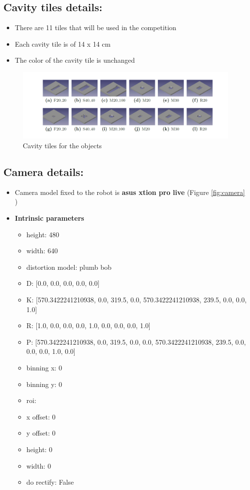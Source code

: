 \documentclass{article}
\begin{document}
\subsection{Cavity tiles details:}
\begin{itemize}
\item There are 11 tiles that will be used in the competition
\item Each cavity tile is of 14 x 14 cm 
\item The color of the cavity tile is unchanged 
\end{itemize}
\begin{figure}[h!]
\centering
\includegraphics[scale=1.0]{images/AllTiles.png}
\caption{Cavity tiles for the objects}
\label{fig:tiles}
\end{figure}


\subsection{Camera details:}
\begin{itemize}
\item Camera model fixed to the robot is \textbf{asus xtion pro live} (Figure \ref{fig:camera} )
\item \textbf{Intrinsic parameters}




\begin{itemize}
\item height: 480
\item width: 640
\item distortion model: plumb bob
\item D: [0.0, 0.0, 0.0, 0.0, 0.0]
\item K: [570.3422241210938, 0.0, 319.5, 0.0, 570.3422241210938, 239.5, 0.0, 0.0, 1.0]
\item R: [1.0, 0.0, 0.0, 0.0, 1.0, 0.0, 0.0, 0.0, 1.0]
\item P: [570.3422241210938, 0.0, 319.5, 0.0, 0.0, 570.3422241210938, 239.5, 0.0, 0.0, 0.0, 1.0, 0.0]
\item binning x: 0
\item binning y: 0
\item roi:
\item x offset: 0
\item y offset: 0
\item height: 0
\item width: 0
\item do rectify: False
\end{itemize} 
\end{itemize}
\end{document}
